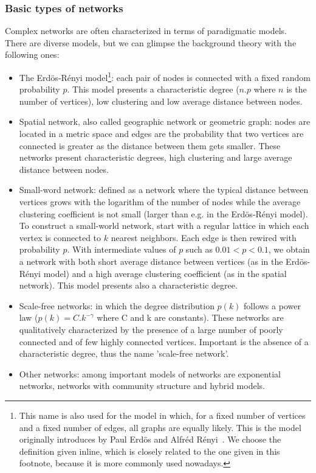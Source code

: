 \subsubsection{Basic types of networks}
Complex networks are often characterized in terms of paradigmatic models.
There are diverse models, but we can glimpse the background theory
with the following ones:
\begin{itemize}
	\item The Erdös-Rényi model\footnote{This name is also used for the model in which, for a fixed number of vertices and a fixed number of edges, all graphs are equally likely. This is the model originally introduces by Paul Erdös and Alfréd Rényi~\cite{erdosOrig}.
		We choose the definition given inline, which is closely related to the one given in this footnote, because it is more commonly used nowadays.}: each pair of nodes is connected with a fixed random probability $p$.
		This model presents a characteristic degree ($n.p$ where $n$ is the number of vertices), low clustering and low average distance between nodes.
	\item Spatial network, also called geographic network or geometric graph: nodes are located in a metric space and edges are the probability that two vertices are connected is greater as the distance between them gets smaller. These networks present characteristic degrees, high clustering and large average distance between nodes.
	\item Small-word network: defined as a network where the typical distance between vertices grows with the logarithm of the number of nodes while the average clustering coefficient is not small (larger than e.g. in the Erdös-Rényi model).
		To construct a small-world network, start with a regular lattice in which each vertex is connected to $k$ nearest neighbors.
		Each edge is then rewired with probability $p$.
		With intermediate values of $p$ such as $0.01<p<0.1$, we obtain a network with both short average distance between vertices (as in the Erdös-Rényi model) and a high average clustering coefficient (as in the spatial network).
		This model presents also a characteristic degree.
	\item Scale-free networks: in which the degree distribution $p(k)$ follows a power law ($p(k)=C.k^{-\gamma}$ where C and k are constants).
		These networks are qualitatively characterized by the presence of a large number of poorly connected and of few highly connected vertices.
		Important is the absence of a characteristic degree, thus the name 'scale-free network'.
	\item Other networks: among important models of networks are exponential networks, networks with community structure and hybrid models.
\end{itemize}
